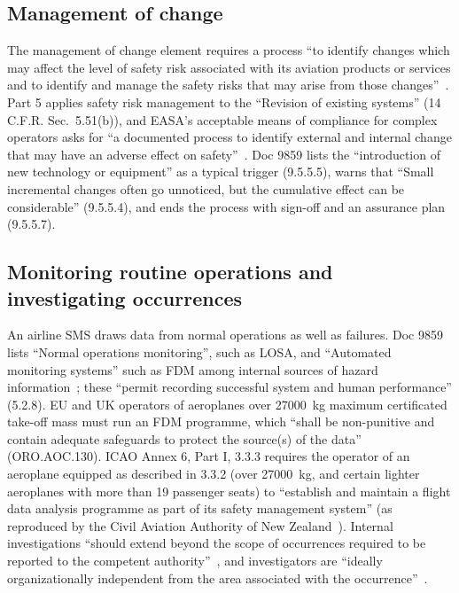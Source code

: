 \documentclass[11pt]{article}
\begin{document}
\subsection{Management of change}\label{sec:moc}

The management of change element requires a process ``to identify changes which may affect the level of safety risk associated with its aviation products or services and to identify and manage the safety risks that may arise from those changes''~\cite[Appendix~2, 3.2]{icao2016annex19}. Part 5 applies safety risk management to the ``Revision of existing systems'' (14 C.F.R. Sec.~5.51(b)), and EASA's acceptable means of compliance for complex operators asks for ``a documented process to identify external and internal change that may have an adverse effect on safety''~\cite[AMC1 ORO.GEN.200(a)(3)(e)]{easa2025amc}. Doc 9859 lists the ``introduction of new technology or equipment'' as a typical trigger (9.5.5.5), warns that ``Small incremental changes often go unnoticed, but the cumulative effect can be considerable'' (9.5.5.4), and ends the process with sign-off and an assurance plan (9.5.5.7).

\subsection{Monitoring routine operations and investigating occurrences}\label{sec:monitoring}

An airline SMS draws data from normal operations as well as failures. Doc 9859 lists ``Normal operations monitoring'', such as LOSA, and ``Automated monitoring systems'' such as FDM among internal sources of hazard information~\cite[9.4.4.1]{icao2018doc9859}; these ``permit recording successful system and human performance'' (5.2.8). EU and UK operators of aeroplanes over \SI{27000}{kg} maximum certificated take-off mass must run an FDM programme, which ``shall be non-punitive and contain adequate safeguards to protect the source(s) of the data'' (ORO.AOC.130). ICAO Annex 6, Part I, 3.3.3 requires the operator of an aeroplane equipped as described in 3.3.2 (over \SI{27000}{kg}, and certain lighter aeroplanes with more than 19 passenger seats) to ``establish and maintain a flight data analysis programme as part of its safety management system'' (as reproduced by the Civil Aviation Authority of New Zealand~\cite{caanz2025annex6}). Internal investigations ``should extend beyond the scope of occurrences required to be reported to the competent authority''~\cite[AMC1 ORO.GEN.200(a)(3)(c)(1)]{easa2025amc}, and investigators are ``ideally organizationally independent from the area associated with the occurrence''~\cite[9.4.5.8]{icao2018doc9859}.
\end{document}
